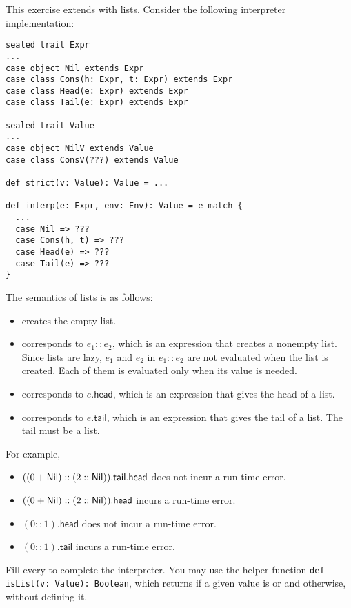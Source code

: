 \begin{exercise}

This exercise extends \lang with lists. Consider the following interpreter
implementation:

\begin{verbatim}
sealed trait Expr
...
case object Nil extends Expr
case class Cons(h: Expr, t: Expr) extends Expr
case class Head(e: Expr) extends Expr
case class Tail(e: Expr) extends Expr

sealed trait Value
...
case object NilV extends Value
case class ConsV(???) extends Value

def strict(v: Value): Value = ...

def interp(e: Expr, env: Env): Value = e match {
  ...
  case Nil => ???
  case Cons(h, t) => ???
  case Head(e) => ???
  case Tail(e) => ???
}
\end{verbatim}

The semantics of lists is as follows:
\begin{itemize}
  \item {} creates the empty list.
  \item {} corresponds to $e_1::e_2$, which is an
    expression that creates a nonempty list. Since lists are lazy, $e_1$ and $e_2$ in
    $e_1::e_2$ are not evaluated when the list is created. Each of
    them is evaluated only when its value is needed.
  \item {} corresponds to $e\textsf{.head}$, which is an expression
    that gives the head of a list.
  \item {} corresponds to $e\textsf{.tail}$, which is an expression
    that gives the tail of a list. The tail must be a list.
\end{itemize}
For example,
\begin{itemize}
  \item $((0+\textsf{Nil})::(2::\textsf{Nil}))\textsf{.tail.head}$ does not incur a run-time error.
  \item $((0+\textsf{Nil})::(2::\textsf{Nil}))\textsf{.head}$ incurs a run-time error.
  \item $(0::1)\textsf{.head}$ does not incur a run-time error.
  \item $(0::1)\textsf{.tail}$ incurs a run-time error.
\end{itemize}

Fill every  to complete the interpreter.  You may use the helper
function \verb!def isList(v: Value): Boolean!, which returns  if a
given value is  or  and  otherwise, without
defining it.

\end{exercise}

